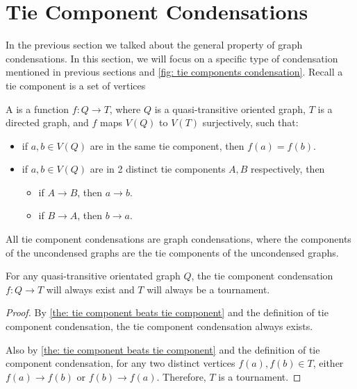 \section{Tie Component Condensations}

In the previous section we talked about the general property
of graph condensations.
In this section, we will focus on a specific type of condensation
mentioned in previous sections and
\cref{fig: tie components condensation}.
Recall a tie component is a set of vertices

\begin{definition}
  A  is a
  function \(f: Q \to T\),
  where \(Q\) is a quasi-transitive oriented graph,
  \(T\) is a directed graph,
  and \(f\) maps \(V(Q)\) to \(V(T)\) surjectively,
  such that:
  \begin{itemize}
    \item if \(a, b \in V(Q)\) are in the same tie component,
      then \(f(a) = f(b)\).
    \item if \(a, b \in V(Q)\) are in 2 distinct tie components
      \(A, B\) respectively,
      then
      \begin{itemize}
        \item if \(A \to B\), then \(a \rightarrow b\).
        \item if \(B \to A\), then \(b \rightarrow a\).
      \end{itemize}
  \end{itemize}
\end{definition}

\begin{corollary}\label{the: tie condensation are condensation}
  All tie component condensations are graph condensations,
  where the components of the uncondensed graphs
  are the tie components of the uncondensed graphs.
\end{corollary}

\begin{corollary}\label{the: tie condensation results in tournament}
  For any quasi-transitive orientated graph \(Q\),
  the tie component condensation \(f: Q \to T\) will always exist
  and \(T\) will always be a tournament.
\end{corollary}
\begin{proof}
  By \cref{the: tie component beats tie component} and
  the definition of tie component condensation,
  the tie component condensation always exists.

  Also by \cref{the: tie component beats tie component} and
  the definition of tie component condensation,
  for any two distinct vertices \(f(a), f(b) \in T\),
  either \(f(a) \to f(b)\) or \(f(b) \to f(a)\).
  Therefore, \(T\) is a tournament.
\end{proof}

